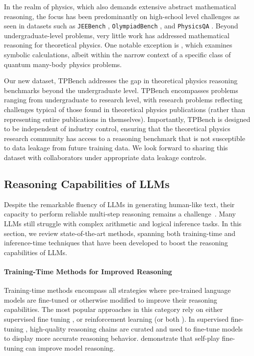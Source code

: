 In the realm of physics, which also demands extensive abstract mathematical reasoning, the focus has been predominantly on high-school level challenges as seen in datasets such as \texttt{JEEBench} \cite{arora2023llmsadvancedenoughchallenging}, \texttt{OlympiadBench} \cite{he2024olympiadbenchchallengingbenchmarkpromoting}, and \texttt{PhysicsQA} \cite{jaiswal2024improvingphysicsreasoninglarge}. Beyond undergraduate-level problems, very little work has addressed mathematical reasoning for theoretical physics. One notable exception is \cite{pan2024quantummanybodyphysicscalculations}, which examines symbolic calculations, albeit within the narrow context of a specific class of quantum many-body physics problems.

Our new dataset, TPBench addresses the gap in theoretical physics reasoning benchmarks beyond the undergraduate level. TPBench encompasses problems ranging from undergraduate to research level, with research problems reflecting challenges typical of those found in theoretical physics publications (rather than representing entire publications in themselves). 
Importantly, TPBench is designed to be independent of industry control, ensuring that the theoretical physics research community has access to a reasoning benchmark that is not susceptible to data leakage from future training data. We look forward to sharing this dataset with collaborators under appropriate data leakage controls.

\subsection{Reasoning Capabilities of LLMs}
\label{sec:related_methods}
Despite the remarkable fluency of LLMs in generating human-like text, their capacity to perform reliable multi-step reasoning remains a challenge~\citep{mirzadeh2024gsm}. Many LLMs still struggle with complex arithmetic and logical inference tasks. In this section, we review state-of-the-art methods, spanning both training-time and inference-time techniques that have been developed to boost the reasoning capabilities of LLMs.

\paragraph{Training-Time Methods for Improved Reasoning}
Training-time methods encompass all strategies where pre-trained language models are fine-tuned or otherwise modified to improve their reasoning capabilities. The most popular approaches in this category rely on either supervised fine tuning \citep{team2025kimi,xu2025redstardoesscalinglongcot,bespoke_stratos}, or reinforcement learning \citep{guo2025deepseek,team2025kimi} (or both \citep{guo2025deepseek}).
In supervised fine-tuning \citep{yu2023metamath,zelikman2022star,zelikman2024quiet, shao2024deepseekmathpushinglimitsmathematical}, high-quality reasoning chains are curated and used to fine-tune models to display more accurate reasoning behavior. \citet{chen2024self} demonstrate that self-play fine-tuning can improve model reasoning. 

